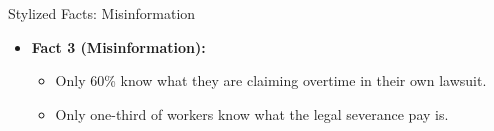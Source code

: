 \documentclass[9pt]{beamer}
\begin{document}
\begin{frame}{Stylized Facts: Misinformation}
    \begin{itemize}
        \item \textbf{Fact 3 (Misinformation):}
        \vspace{0.05in}
        \begin{itemize}
            \item Only 60\%  know what they are claiming overtime in their own lawsuit. 
            \vspace{0.05in}
            \item Only one-third of workers know what the legal severance pay is.
        \end{itemize}
        
    \end{itemize}
    

\end{frame}
\end{document}
